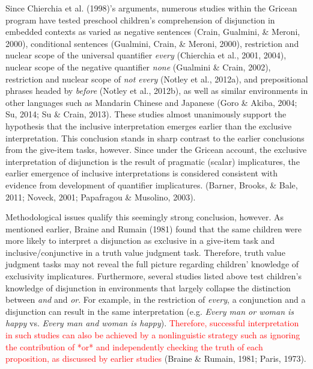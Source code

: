 \documentclass[,man,floatsintext]{apa6}
\begin{document}
Since Chierchia et al. (1998)'s arguments, numerous studies within the Gricean program have tested preschool children's comprehension of disjunction in embedded contexts as varied as negative sentences (Crain, Gualmini, \& Meroni, 2000), conditional sentences (Gualmini, Crain, \& Meroni, 2000), restriction and nuclear scope of the universal quantifier \emph{every} (Chierchia et al., 2001, 2004), nuclear scope of the negative quantifier \emph{none} (Gualmini \& Crain, 2002), restriction and nuclear scope of \emph{not every} (Notley et al., 2012a), and prepositional phrases headed by \emph{before} (Notley et al., 2012b), as well as similar environments in other languages such as Mandarin Chinese and Japanese (Goro \& Akiba, 2004; Su, 2014; Su \& Crain, 2013). These studies almost unanimously support the hypothesis that the inclusive interpretation emerges earlier than the exclusive interpretation. This conclusion stands in sharp contrast to the earlier conclusions from the give-item tasks, however. Since under the Gricean account, the exclusive interpretation of disjunction is the result of pragmatic (scalar) implicatures, the earlier emergence of inclusive interpretations is considered consistent with evidence from development of quantifier implicatures. (Barner, Brooks, \& Bale, 2011; Noveck, 2001; Papafragou \& Musolino, 2003).

Methodological issues qualify this seemingly strong conclusion, however. As mentioned earlier, Braine and Rumain (1981) found that the same children were more likely to interpret a disjunction as exclusive in a give-item task and inclusive/conjunctive in a truth value judgment task. Therefore, truth value judgment tasks may not reveal the full picture regarding children' knowledge of exclusivity implicatures. Furthermore, several studies listed above test children's knowledge of disjunction in environments that largely collapse the distinction between \emph{and} and \emph{or}. For example, in the restriction of \emph{every}, a conjunction and a disjunction can result in the same interpretation (e.g. \emph{Every man or woman is happy} vs. \emph{Every man and woman is happy}). \textcolor{red}{Therefore, successful interpretation in such studies can also be achieved by a nonlinguistic strategy such as ignoring the contribution of *or* and independently checking the truth of  each proposition, as discussed by earlier studies} (Braine \& Rumain, 1981; Paris, 1973).
\end{document}
